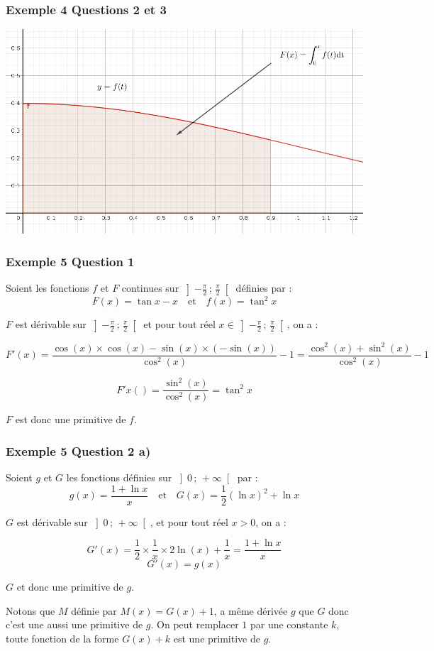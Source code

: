 \documentclass[11pt, hyperref={urlcolor=red,%
            linkcolor=blue, %
            colorlinks=true}]{beamer}
\newcommand{\Interoo}[2]{\left]#1\, ;\, #2\right[}
\begin{document}
\begin{frame}
\frametitle{Exemple 4 Questions 2 et 3}

\begin{center}
\includegraphics[scale=0.2]{images/exemple4.png}
\end{center}


\end{frame}


\begin{frame}
\frametitle{Exemple 5 Question 1}
\label{exemple5}

Soient les fonctions $f$ et $F$ continues sur $\Interoo{-\frac{\pi}{2}}{\frac{\pi}{2}}$ définies  par :
$$F(x)=\tan x - x \quad \text{et} \quad  f(x)=\tan^{2} x$$

$F$ est dérivable sur $\Interoo{-\frac{\pi}{2}}{\frac{\pi}{2}}$ et pour tout réel $x \in \Interoo{-\frac{\pi}{2}}{\frac{\pi}{2}}$, on a :

$$F'(x)= \frac{\cos( x )\times \cos(x) - \sin(x) \times (-\sin(x))}{\cos^{2}(x)} - 1 = \frac{\cos^{2}(x) + \sin^{2}(x)}{\cos^{2}(x)}-1$$

$$F'x()=  \frac{\sin^{2}(x)}{\cos^{2}(x)}= \tan^{2} x$$

$F$ est donc une primitive de $f$.





\end{frame}





\begin{frame}
\frametitle{Exemple 5 Question 2 a)}

Soient $g$ et $G$ les fonctions définies sur $\Interoo{0}{+\infty}$ par :
$$g(x)=\frac{1+\ln x}{x} \quad \text{et} \quad G(x)=\frac{1}{2}\left(\ln x \right)^{2}+\ln x $$

$G$ est dérivable sur $\Interoo{0}{+\infty}$, et pour tout réel $x>0$, on a :

$$G'(x)=\frac{1}{2} \times \frac{1}{x} \times 2 \ln(x) + \frac{1}{x}=\frac{1+\ln x}{x}$$
$$G'(x)=g(x)$$

$G$ et donc une primitive de $g$.

Notons que $M$ définie par $M(x)=G(x)+1$, a même dérivée $g$ que $G$ donc c'est une aussi une primitive de $g$. On peut remplacer $1$ par une constante $k$, toute fonction de la forme $G(x)+k$ est une primitive de $g$.

\end{frame}
\end{document}
